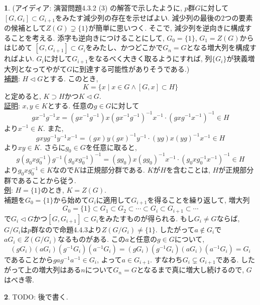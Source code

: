 \documentclass{article}
\theoremstyle{definition}
\newtheorem{ans}{}
\numberwithin{ans}{subsection}
\begin{document}
\begin{ans}
  (アイディア: 演習問題4.3.2 (3) の解答で示したように, $p$群$G$に対して$[G, G_i] \subset G_{i+1}$をみたす減少列の存在を示せばよい.
  減少列の最後の$2$つの要素の候補として$Z(G) \supsetneq \{1\}$が簡単に思いつく.
  そこで, 減少列を逆向きに構成することを考える. 添字も逆向きにつけることにして, $G_0 = \{1\}$, $G_1 = Z(G)$からはじめて
  $[G, G_{i+1}] \subset G_{i}$をみたし、かつどこかで$G_n = G$となる増大列を構成すればよい.
  $G_{i}$に対して$G_{i+1}$をなるべく大きく取るようにすれば, 列$\{G_i\}$が狭義増大列となってやがて$G$に到達する可能性がありそうである.)\\

  \underline{補題}: $H \triangleleft G$とする. このとき,
  \[
    K = \{x \mid x \in G \land [G, x] \subset H \}
  \]
  と定めると, $K \supset H$かつ$K \triangleleft G$.\\

  \underline{証明}: $x, y \in K$とする. 任意の$g \in G$に対して
  \[
    gx^{-1}g^{-1}x = (gx^{-1}g^{-1})x(gx^{-1}g^{-1})^{-1}x^{-1} \cdot (gxg^{-1}x^{-1})^{-1} \in H
  \]
  より$x^{-1} \in K$. また,
  \[
    gxyg^{-1}y^{-1}x^{-1} = (gx)y(gx)^{-1}y^{-1} \cdot (yg)x(yg)^{-1}x^{-1} \in H
  \]
  より$xy \in K$. さらに$g_0 \in G$を任意に取ると,
  \[
    g(g_0xg_0^{-1})g^{-1}(g_0xg_0^{-1})^{-1} = (gg_0)x(gg_0)^{-1}x^{-1} \cdot (g_0xg_0^{-1}x^{-1})^{-1} \in H
  \]
  より$g_0xg_0^{-1} \in K$なので$K$は正規部分群である.
  $K$が$H$を含むことは, $H$が正規部分群であることから従う.\\

  \underline{例}: $H = \{1\}$のとき, $K = Z(G)$.\\

  補題を$G_0 = \{1\}$から始めて$G_i$に適用して$G_{i+1}$を得ることを繰り返して,
  増大列
  \[
    G_0 = \{1\} \subset G_1 \subset G_2 \subset \cdots \subset G_i \subset G_{i+1} \subset \cdots
  \]
  で$G_i \triangleleft G$かつ$[G, G_{i+1}] \subset G_{i}$をみたすものが得られる.
  もし$G_i \neq G$ならば, $G/G_i$は$p$群なので命題4.4.3より$Z(G/G_i) \neq \{1\}$.
  したがって$a \notin G_i$で$aG_i \in Z(G/G_i)$なるものがある. この$a$と任意の$g \in G$について,
  \[
    (gG_i)(aG_i)(g^{-1}G_i)(a^{-1}G_i) = (gG_i)(g^{-1}G_i)(aG_i)(a^{-1}G_i) = G_i
  \]
  であることから$gag^{-1}a^{-1} \in G_i$, よって$a \in G_{i+1}$.
  すなわち$G_i \subsetneq G_{i+1}$である.
  したがって上の増大列はある$n$について$G_n = G$となるまで真に増大し続けるので, $G$はべき零.
\end{ans}

\begin{ans}
  TODO: 後で書く.
\end{ans}
\end{document}
